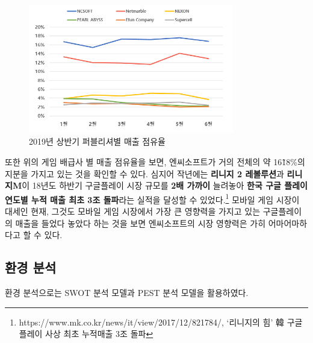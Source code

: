 \documentclass[11pt]{oblivoir}
\begin{document}
		 \begin{figure}[htbp]
		 	\centering
		 	\includegraphics[width=0.8\textwidth]{Pictures/PublisherMaechul.png}
		 	\caption{2019년 상반기 퍼블리셔별 매출 점유율}
		 \end{figure}
	 
	 	또한 위의 게임 배급사 별 매출 점유율을 보면, 엔씨소프트가 거의 전체의 약 16\~18\%의 지분을 가지고 있는 것을 확인할 수 있다. 심지어 작년에는 \textbf{리니지 2 레볼루션}과 
	 	\textbf{리니지M}이 18년도 하반기 구글플레이 시장 규모를 \textbf{2배 가까이} 늘려놓아 \textbf{한국 구글 플레이 연도별 누적 매출 최초 3조 돌파}라는 실적을 달성할 수 있었다.\footnote{https://www.mk.co.kr/news/it/view/2017/12/821784/, ‘리니지의 힘’ 韓 구글 플레이 사상 최초 누적매출 3조 돌파} 모바일 게임 시장이 대세인 현재, 그것도 모바일 게임 시장에서 가장 큰 영향력을 가지고 있는 구글플레이의 매출을 들었다 놓았다 하는 것을 보면 엔씨소프트의 시장 영향력은 가히 어마어마하다고 할 수 있다.
	 	\pagebreak
	 	
		\subsection{환경 분석}
		환경 분석으로는 SWOT 분석 모델과 PEST 분석 모델을 활용하였다. 
		
\end{document}
